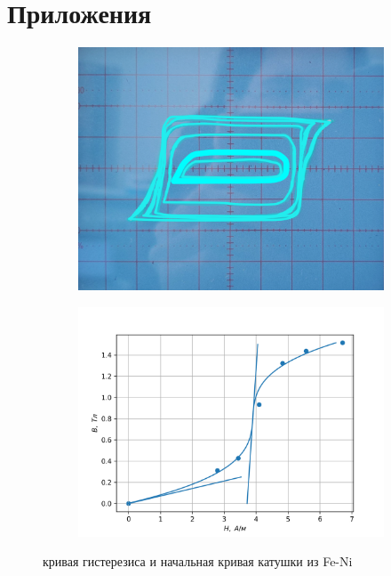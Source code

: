 \documentclass[14pt, a4paper]{report}
\begin{document}
\section{Приложения}

\begin{figure}
	\centering
	\begin{subfigure}{.5\textwidth}
		\centering
		\includegraphics[width=\linewidth]{images/345_4.png}
	\end{subfigure}%
	\begin{subfigure}{.5\textwidth}
		\centering
		\includegraphics[width=\linewidth]{images/345_1.png}
	\end{subfigure}
	\caption{кривая гистерезиса и начальная кривая катушки из Fe-Ni}
\end{figure}
\end{document}
